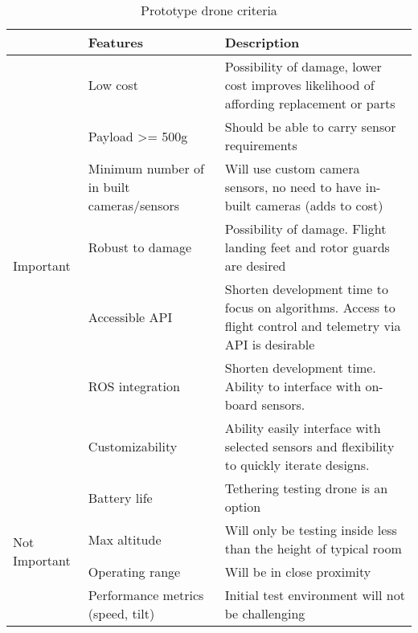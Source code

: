 \documentclass[capstone_report.tex]{subfiles}
\begin{document}
\begin{table}[H]
\centering
\label{test_requirements}
\begin{tabular}{lp{6cm}p{8cm}}
\toprule
                               & Features                                   & Description                                                                                                   \\ \midrule
\multirow{7}{*}{Important}     & Low cost                                   & Possibility of damage, lower cost improves likelihood of affording replacement or parts                       \\
                               & Payload \textgreater= 500g                 & Should be able to carry sensor requirements                                                                   \\
                               & Minimum number of in built cameras/sensors & Will use custom camera sensors, no need to have in-built cameras (adds to cost)                               \\
                               & Robust to damage                           & Possibility of damage.  Flight landing feet and rotor guards are desired                                      \\
                               & Accessible API                             & Shorten development time to focus on algorithms.  Access to flight control and telemetry via API is desirable \\
                               & ROS integration                            & Shorten development time.  Ability to interface with on-board sensors.                                        \\
                               & Customizability                            & Ability easily interface with selected sensors and flexibility to quickly iterate designs.                    \\
\midrule
\multirow{5}{*}{Not Important} & Battery life                               & Tethering testing drone is an option                                                                          \\
                               & Max altitude                               & Will only be testing inside less than the height of typical room                                              \\
                               & Operating range                            &   Will be in close proximity                                                                                                            \\
                               & Performance metrics (speed, tilt)          & Initial test environment will not be challenging                                                              \\ \midrule
\end{tabular}
\caption{Prototype drone criteria\label{tab:dronecriteria}}
\end{table}
\end{document}

